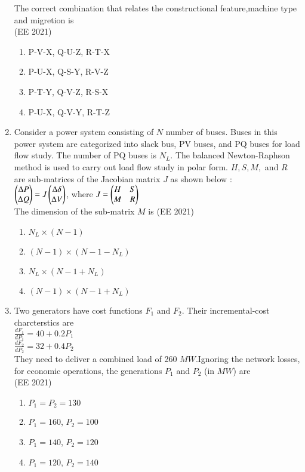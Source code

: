 \documentclass[journal,12pt,onecolumn]{IEEEtran}
\theoremstyle{remark}
\begin{document}
\begin{enumerate}
The correct combination that relates the constructional feature,machine type and migretion is \\
\text{ } \hfill{(EE 2021)}
\begin{enumerate}
\item P-V-X, Q-U-Z, R-T-X
\item P-U-X, Q-S-Y, R-V-Z
\item P-T-Y, Q-V-Z, R-S-X
\item P-U-X, Q-V-Y, R-T-Z
\end{enumerate}
\item Consider a power system consisting of $N$ number of buses. Buses in this power system are categorized into slack bus, PV buses, and PQ buses for load flow study. The number of PQ buses is $N_L$. The balanced Newton-Raphson method is used to carry out load flow study in polar form. $H,S,M,$ and $R$ are sub-matrices of the Jacobian matrix $J$ as shown below :\\
$\begin{pmatrix}\Delta{P} \\ \Delta{Q}\end{pmatrix} =J\begin{pmatrix}\Delta{\delta} \\ \Delta{V}\end{pmatrix}$, where $J=\begin{pmatrix}H & S \\ M&R\end{pmatrix}$ \\
The dimension of the sub-matrix $M$ is
\hfill{(EE 2021)}
\begin{enumerate}
\item $N_L\times(N-1)$
\item $(N-1)\times(N-1-N_L)$
\item $N_L\times(N-1+N_L)$
\item $(N-1)\times(N-1+N_L)$
\end{enumerate}
\item Two generators have cost functions $F_1$ and $F_2$. Their incremental-cost charcterstics are \\
$\frac{dF_1}{dP_1} = 40 + 0.2P_1$ \\
$\frac{dF_2}{dP_2} = 32 + 0.4P_2$ \\
They need to deliver a combined load of 260 $MW$.Ignoring the network losses, for economic operations, the generations $P_1$ and $P_2$ (in $MW$) are \\
\text{ } \hfill{(EE 2021)}
\begin{enumerate}
\item $P_1 = P_2 = 130$
\item $P_1=160$, $P_2=100$
\item $P_1=140$, $P_2=120$
\item $P_1=120$, $P_2=140$
\end{enumerate}

\end{enumerate}
\end{document}

